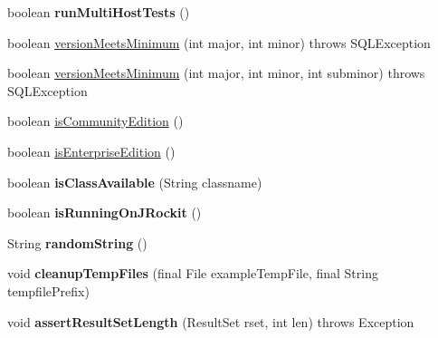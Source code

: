 \begin{DoxyCompactItemize}
\mbox{\label{classtestsuite_1_1_base_test_case_a145dcd536d811f0f904c1d711cf275f7}} 
boolean {\bfseries run\+Multi\+Host\+Tests} ()
\item 
boolean \mbox{\hyperlink{classtestsuite_1_1_base_test_case_a4098e9a480c1907875ded976cdbc81a3}{version\+Meets\+Minimum}} (int major, int minor)  throws S\+Q\+L\+Exception 
\item 
boolean \mbox{\hyperlink{classtestsuite_1_1_base_test_case_a13e93e8347469a0c2e8dbf3be8795bb5}{version\+Meets\+Minimum}} (int major, int minor, int subminor)  throws S\+Q\+L\+Exception 
\item 
boolean \mbox{\hyperlink{classtestsuite_1_1_base_test_case_a30a8a94757291826321a07c5b10a6233}{is\+Community\+Edition}} ()
\item 
boolean \mbox{\hyperlink{classtestsuite_1_1_base_test_case_ae29a3a848b87638921a7078f572b3f83}{is\+Enterprise\+Edition}} ()
\item 
\mbox{\label{classtestsuite_1_1_base_test_case_af67350d0499d7649ea352fddd70b0be2}} 
boolean {\bfseries is\+Class\+Available} (String classname)
\item 
\mbox{\label{classtestsuite_1_1_base_test_case_aa78a5395ed790afc608520b5dc239552}} 
boolean {\bfseries is\+Running\+On\+J\+Rockit} ()
\item 
\mbox{\label{classtestsuite_1_1_base_test_case_ad7304f085aa6f697299a0a10fb1f0e4d}} 
String {\bfseries random\+String} ()
\item 
\mbox{\label{classtestsuite_1_1_base_test_case_a604f630b7961dd73826ab5416a076ec7}} 
void {\bfseries cleanup\+Temp\+Files} (final File example\+Temp\+File, final String tempfile\+Prefix)
\item 
\mbox{\label{classtestsuite_1_1_base_test_case_aa23dd720e89199dbafdc084069ed2ef3}} 
void {\bfseries assert\+Result\+Set\+Length} (Result\+Set rset, int len)  throws Exception 
\item 
\mbox{\label{classtestsuite_1_1_base_test_case_a9610d1a24e717741f2ec5cd310361d45}} 

\end{DoxyCompactItemize}
